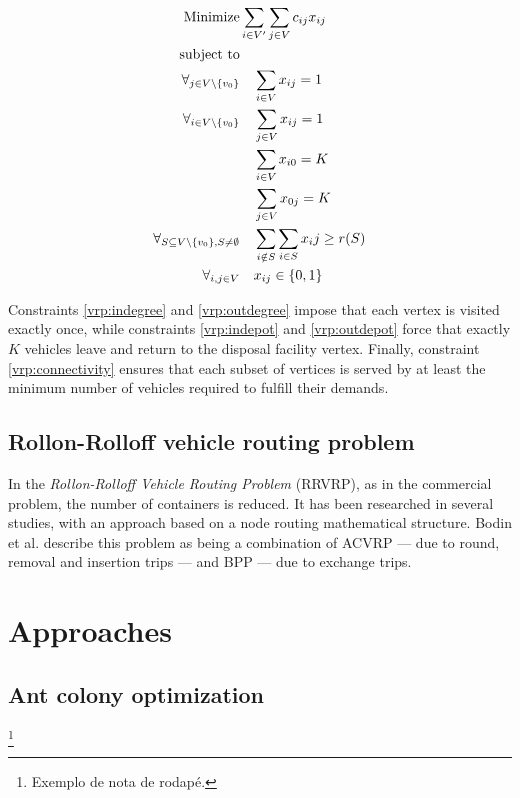 \begin{align}
	\mbox{Minimize} & \sum_{i \in V^\prime} \sum_{j \in V} c_{ij} x_{ij}
	\\
	\mbox{subject to} & \notag{}
	\\
	\forall_{j \in V \setminus \{v_0\}} & \quad \sum_{i \in V} x_{ij} = 1
	\label{vrp:indegree}
	\\
	\forall_{i \in V \setminus \{v_0\}} & \quad \sum_{j \in V} x_{ij} = 1
	\label{vrp:outdegree}
	\\
	& \quad \sum_{i \in V} x_{i0} = K \label{vrp:indepot} \\
	& \quad \sum_{j \in V} x_{0j} = K \label{vrp:outdepot} \\
	\forall_{S \subseteq V \setminus \{v_0\}, S \neq \emptyset} & \quad
	\sum_{i \notin S} \sum_{i \in S} x_ij \geq r(S)
	\label{vrp:connectivity}
	\\
	\forall_{i, j \in V} & \quad x_{ij} \in \{0, 1\}
\end{align}

Constraints \eqref{vrp:indegree} and \eqref{vrp:outdegree} impose that each
vertex is visited exactly once, while constraints \eqref{vrp:indepot} and
\eqref{vrp:outdepot} force that exactly $K$ vehicles leave and return to the
disposal facility vertex. Finally, constraint \eqref{vrp:connectivity} ensures
that each subset of vertices is served by at least the minimum number of
vehicles required to fulfill their demands.


\subsection{Rollon-Rolloff vehicle routing problem}

In the \textit{Rollon-Rolloff Vehicle Routing Problem} (RRVRP), as in the
commercial problem, the number of containers is reduced. It has been researched
in several studies, with an approach based on a node routing mathematical
structure\citep{Bodin00,Aringhieri04,Meulemeester97}. Bodin et al. describe
this problem as being a combination of ACVRP --- due to round, removal and
insertion trips --- and BPP --- due to exchange trips.


\section{Approaches}

\subsection{Ant colony optimization}


\footnote{Exemplo de nota de rodapé.}

